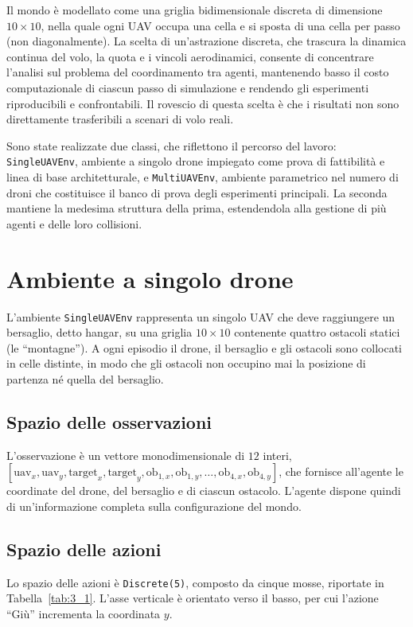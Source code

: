 \documentclass[12pt,a4paper,twoside]{report}
\begin{document}
Il mondo è modellato come una griglia bidimensionale discreta di dimensione $10 \times 10$, nella quale ogni UAV occupa una cella e si sposta di una cella per passo (non diagonalmente). La scelta di un'astrazione discreta, che trascura la dinamica continua del volo, la quota e i vincoli aerodinamici, consente di concentrare l'analisi sul problema del coordinamento tra agenti, mantenendo basso il costo computazionale di ciascun passo di simulazione e rendendo gli esperimenti riproducibili e confrontabili. Il rovescio di questa scelta è che i risultati non sono direttamente trasferibili a scenari di volo reali.

Sono state realizzate due classi, che riflettono il percorso del lavoro: \texttt{SingleUAVEnv}, ambiente a singolo drone impiegato come prova di fattibilità e linea di base architetturale, e \texttt{MultiUAVEnv}, ambiente parametrico nel numero di droni che costituisce il banco di prova degli esperimenti principali. La seconda mantiene la medesima struttura della prima, estendendola alla gestione di più agenti e delle loro collisioni.
\newpage
\section{Ambiente a singolo drone}
\label{sec:ambiente_singolo}

L'ambiente \texttt{SingleUAVEnv} rappresenta un singolo UAV che deve raggiungere un bersaglio, detto hangar, su una griglia $10 \times 10$ contenente quattro ostacoli statici (le ``montagne''). A ogni episodio il drone, il bersaglio e gli ostacoli sono collocati in celle distinte, in modo che gli ostacoli non occupino mai la posizione di partenza né quella del bersaglio.

\subsection{Spazio delle osservazioni}
L'osservazione è un vettore monodimensionale di $12$ interi, $[\text{uav}_x, \allowbreak \text{uav}_y, \allowbreak \text{target}_x, \allowbreak \text{target}_y, \allowbreak \text{ob}_{1,x}, \allowbreak \text{ob}_{1,y}, \allowbreak \dots, \allowbreak \text{ob}_{4,x}, \allowbreak \text{ob}_{4,y}]$, che fornisce all'agente le coordinate del drone, del bersaglio e di ciascun ostacolo. L'agente dispone quindi di un'informazione completa sulla configurazione del mondo.

\subsection{Spazio delle azioni}
Lo spazio delle azioni è \texttt{Discrete(5)}, composto da cinque mosse, riportate in Tabella~\ref{tab:3_1}. L'asse verticale è orientato verso il basso, per cui l'azione ``Giù'' incrementa la coordinata $y$.
\end{document}
